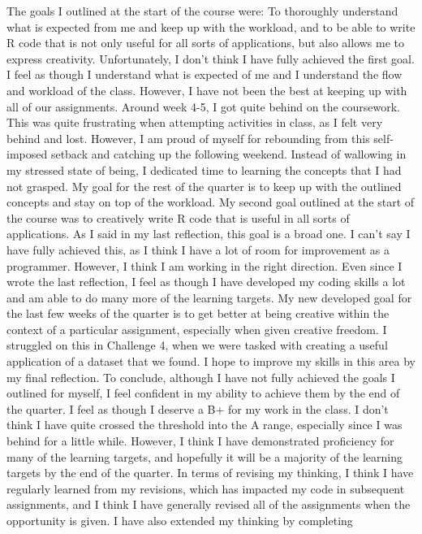 \documentclass[
  letterpaper,
  DIV=11,
  numbers=noendperiod]{scrartcl}
\begin{document}
The goals I outlined at the start of the course were: To thoroughly
understand what is expected from me and keep up with the workload, and
to be able to write R code that is not only useful for all sorts of
applications, but also allows me to express creativity. Unfortunately, I
don't think I have fully achieved the first goal. I feel as though I
understand what is expected of me and I understand the flow and workload
of the class. However, I have not been the best at keeping up with all
of our assignments. Around week 4-5, I got quite behind on the
coursework. This was quite frustrating when attempting activities in
class, as I felt very behind and lost. However, I am proud of myself for
rebounding from this self-imposed setback and catching up the following
weekend. Instead of wallowing in my stressed state of being, I dedicated
time to learning the concepts that I had not grasped. My goal for the
rest of the quarter is to keep up with the outlined concepts and stay on
top of the workload. My second goal outlined at the start of the course
was to creatively write R code that is useful in all sorts of
applications. As I said in my last reflection, this goal is a broad one.
I can't say I have fully achieved this, as I think I have a lot of room
for improvement as a programmer. However, I think I am working in the
right direction. Even since I wrote the last reflection, I feel as
though I have developed my coding skills a lot and am able to do many
more of the learning targets. My new developed goal for the last few
weeks of the quarter is to get better at being creative within the
context of a particular assignment, especially when given creative
freedom. I struggled on this in Challenge 4, when we were tasked with
creating a useful application of a dataset that we found. I hope to
improve my skills in this area by my final reflection. To conclude,
although I have not fully achieved the goals I outlined for myself, I
feel confident in my ability to achieve them by the end of the quarter.
I feel as though I deserve a B+ for my work in the class. I don't think
I have quite crossed the threshold into the A range, especially since I
was behind for a little while. However, I think I have demonstrated
proficiency for many of the learning targets, and hopefully it will be a
majority of the learning targets by the end of the quarter. In terms of
revising my thinking, I think I have regularly learned from my
revisions, which has impacted my code in subsequent assignments, and I
think I have generally revised all of the assignments when the
opportunity is given. I have also extended my thinking by completing
\end{document}
